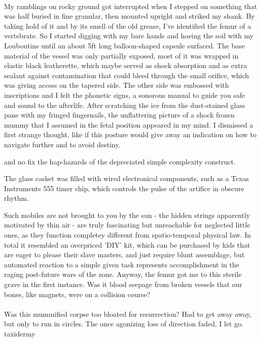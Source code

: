 \documentclass{article}
\begin{document}
\paragraph{}
My ramblings on rocky ground got interrupted
when I stepped on something 
that was half buried in fine granular, 
then mounted upright and striked my shank. 
By taking hold of it and by its smell of the old grease, 
I've identified the femur of a vertebrate. 
So I started digging with my bare hands and 
hoeing the soil with my Louboutins
until an about 5ft long balloon-shaped capsule surfaced. The base material of the vessel was only partially exposed, 
most of it was wrapped in elastic black leatherette,
which maybe served as shock absorption 
and as extra sealant against contamination
that could bleed through the small orifice, which was giving access on the tapered side. 
The other side was embossed with inscriptions 
and I felt the phonetic signs, 
a sonorous manual to guide you safe and sound to the afterlife.
After scratching the ice from the dust-stained glass pane with my fringed fingernails, 
the unflattering picture of a shock frozen mummy
that I assumed in the fetal position appeared in my mind.
I dismissed a first strange thought, like if this posture would give away an
indication on how to navigate further and to avoid destiny. 


and no fix the hap-hazards of the depreciated simple complexity construct.

The glass casket was filled with wired electronical components, 
such as a Texas Instruments 555 timer chip, 
which controls the pulse of the artifice in obscure rhythm.


Such mobiles are not brought to you by the sun - 
the hidden strings apparently motivated by thin air -
are truly fascinating but unreachable for neglected little ones,
as they function completey different from spatio-temporal physical law.
In total it resembled an overpriced 'DIY' kit, 
which can be purchased by kids that are eager to please their slave masters, 
and just require blunt assemblage, 
but automated reaction to a simple given task represents 
accomplishment in the raging post-future wars of the zone.
Anyway, the femur got me to this sterile grave in the first instance.
Was it blood seepage from broken vessels
that our bones, like magnets, were on a collision course?

\paragraph{}
Was this mummified corpse too bloated for resurrection?
Had to get away away, but only to run in circles.
The once agonizing loss of direction faded, I let go.
taxidermy
\end{document}
